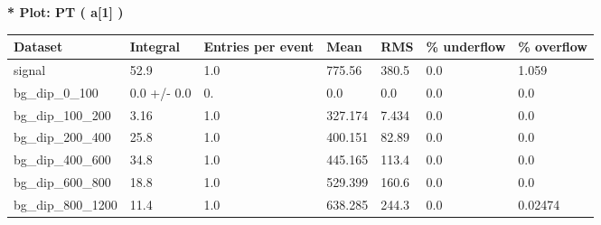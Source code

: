 \documentclass[a4paper, 10pt]{article}
\begin{document}
\textbf{* Plot: PT ( a[1] ) }\\
   \begin{table}[H]
  \begin{center}
    \begin{tabular}{|m{23.0mm}|m{23.0mm}|m{18.0mm}|m{19.0mm}|m{19.0mm}|m{19.0mm}|m{19.0mm}|}
      \hline
      {\cellcolor{yellow}         Dataset}& {\cellcolor{yellow}         Integral}& {\cellcolor{yellow}         Entries per event}& {\cellcolor{yellow}         Mean}& {\cellcolor{yellow}         RMS}& {\cellcolor{yellow}         \% underflow}& {\cellcolor{yellow}         \% overflow}\\
      \hline
      {\cellcolor{white}         signal}& {\cellcolor{white}         52.9}& {\cellcolor{white}         1.0}& {\cellcolor{white}         775.56}& {\cellcolor{white}         380.5}& {\cellcolor{green}         0.0}& {\cellcolor{green}         1.059}\\
      \hline
      {\cellcolor{white}         bg\_dip\_0\_100}& {\cellcolor{white}         0.0 +/\-- 0.0}& {\cellcolor{white}         0.}& {\cellcolor{white}         0.0}& {\cellcolor{white}         0.0}& {\cellcolor{green}         0.0}& {\cellcolor{green}         0.0}\\
      \hline
      {\cellcolor{white}         bg\_dip\_100\_200}& {\cellcolor{white}         3.16}& {\cellcolor{white}         1.0}& {\cellcolor{white}         327.174}& {\cellcolor{white}         7.434}& {\cellcolor{green}         0.0}& {\cellcolor{green}         0.0}\\
      \hline
      {\cellcolor{white}         bg\_dip\_200\_400}& {\cellcolor{white}         25.8}& {\cellcolor{white}         1.0}& {\cellcolor{white}         400.151}& {\cellcolor{white}         82.89}& {\cellcolor{green}         0.0}& {\cellcolor{green}         0.0}\\
      \hline
      {\cellcolor{white}         bg\_dip\_400\_600}& {\cellcolor{white}         34.8}& {\cellcolor{white}         1.0}& {\cellcolor{white}         445.165}& {\cellcolor{white}         113.4}& {\cellcolor{green}         0.0}& {\cellcolor{green}         0.0}\\
      \hline
      {\cellcolor{white}         bg\_dip\_600\_800}& {\cellcolor{white}         18.8}& {\cellcolor{white}         1.0}& {\cellcolor{white}         529.399}& {\cellcolor{white}         160.6}& {\cellcolor{green}         0.0}& {\cellcolor{green}         0.0}\\
      \hline
      {\cellcolor{white}         bg\_dip\_800\_1200}& {\cellcolor{white}         11.4}& {\cellcolor{white}         1.0}& {\cellcolor{white}         638.285}& {\cellcolor{white}         244.3}& {\cellcolor{green}         0.0}& {\cellcolor{green}         0.02474}\\

\end{tabular}
\end{center}
\end{table}
\end{document}
